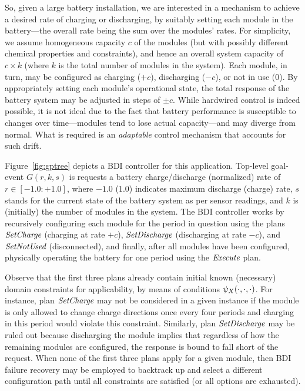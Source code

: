 So, given a large battery installation, we are interested in a mechanism to achieve a desired rate of charging or discharging, by suitably setting each module in the battery---the overall rate being the sum over the modules' rates.  
For simplicity, we assume homogeneous capacity $c$ of the modules (but with possibly different chemical properties and constraints), and hence an overall system capacity of $c \times k$ (where $k$ is the total number of modules in the system). Each module, in turn, may be configured as charging ($+c$), discharging ($-c$), or not in use ($0$). By appropriately setting each module's operational state, the total response of the battery system may be adjusted in steps of $\pm c$.
While hardwired control is indeed possible, it is not ideal due to the fact that battery performance is susceptible to changes over time---modules tend to lose actual capacity---and may diverge from normal. 
What is required is an \emph{adaptable} control mechanism that accounts for such drift. 

Figure~\ref{fig:gptree} depicts a BDI controller for this application. Top-level goal-event $G(r,k,s)$ is requests a battery charge/discharge (normalized) rate of $r \in [-1.0:+1.0]$, where $-1.0$ ($1.0$) indicates maximum discharge (charge) rate, $s$ stands for the current state of the battery system as per sensor readings, and $k$ is (initially) the number of modules in the system. 
The BDI controller works by recursively configuring each module for the period in question using the plans $\operatorname{\textit{SetCharge}}$ (charging at rate $+c$), $\operatorname{\textit{SetDischarge}}$ (discharging at rate $-c$), and $\operatorname{\textit{SetNotUsed}}$ (disconnected), and finally, after all modules have been configured, physically operating the battery for one period using the $\operatorname{\textit{Execute}}$ plan. 

Observe that the first three plans already contain initial known (necessary) domain constraints for applicability, by means of conditions $\psi_X(\cdot,\cdot,\cdot)$. For instance, plan $\operatorname{\textit{SetCharge}}$ may not be considered in a given instance if the module is only allowed to change charge directions once every four periods and charging in this period would violate this constraint. 
Similarly, plan $\operatorname{\textit{SetDischarge}}$ may be ruled out because discharging the module implies that regardless of how the remaining modules are configured, the response is bound to fall short of the request.
When none of the first three plans apply for a given module, then BDI failure recovery may be employed to backtrack up and select a different configuration path until all constraints are satisfied (or all options are exhausted). 

